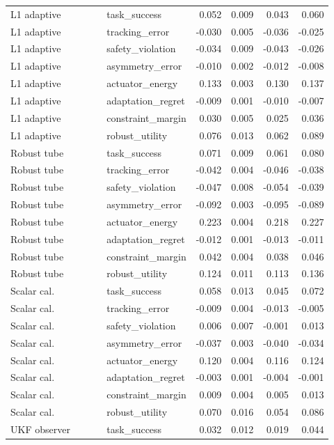 \documentclass{article}
\begin{document}
\begin{center}
\begin{longtable}{p{0.31\linewidth}p{0.23\linewidth}rrrr}
L1 adaptive & task\_success & 0.052 & 0.009 & 0.043 & 0.060\\
L1 adaptive & tracking\_error & -0.030 & 0.005 & -0.036 & -0.025\\
L1 adaptive & safety\_violation & -0.034 & 0.009 & -0.043 & -0.026\\
L1 adaptive & asymmetry\_error & -0.010 & 0.002 & -0.012 & -0.008\\
L1 adaptive & actuator\_energy & 0.133 & 0.003 & 0.130 & 0.137\\
L1 adaptive & adaptation\_regret & -0.009 & 0.001 & -0.010 & -0.007\\
L1 adaptive & constraint\_margin & 0.030 & 0.005 & 0.025 & 0.036\\
L1 adaptive & robust\_utility & 0.076 & 0.013 & 0.062 & 0.089\\
Robust tube & task\_success & 0.071 & 0.009 & 0.061 & 0.080\\
Robust tube & tracking\_error & -0.042 & 0.004 & -0.046 & -0.038\\
Robust tube & safety\_violation & -0.047 & 0.008 & -0.054 & -0.039\\
Robust tube & asymmetry\_error & -0.092 & 0.003 & -0.095 & -0.089\\
Robust tube & actuator\_energy & 0.223 & 0.004 & 0.218 & 0.227\\
Robust tube & adaptation\_regret & -0.012 & 0.001 & -0.013 & -0.011\\
Robust tube & constraint\_margin & 0.042 & 0.004 & 0.038 & 0.046\\
Robust tube & robust\_utility & 0.124 & 0.011 & 0.113 & 0.136\\
Scalar cal. & task\_success & 0.058 & 0.013 & 0.045 & 0.072\\
Scalar cal. & tracking\_error & -0.009 & 0.004 & -0.013 & -0.005\\
Scalar cal. & safety\_violation & 0.006 & 0.007 & -0.001 & 0.013\\
Scalar cal. & asymmetry\_error & -0.037 & 0.003 & -0.040 & -0.034\\
Scalar cal. & actuator\_energy & 0.120 & 0.004 & 0.116 & 0.124\\
Scalar cal. & adaptation\_regret & -0.003 & 0.001 & -0.004 & -0.001\\
Scalar cal. & constraint\_margin & 0.009 & 0.004 & 0.005 & 0.013\\
Scalar cal. & robust\_utility & 0.070 & 0.016 & 0.054 & 0.086\\
UKF observer & task\_success & 0.032 & 0.012 & 0.019 & 0.044\\

\end{longtable}
\end{center}
\end{document}
